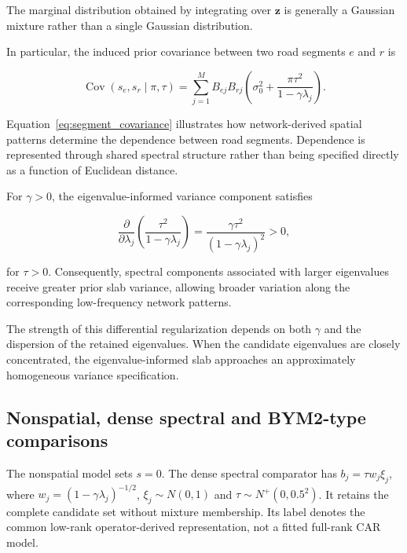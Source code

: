 \documentclass[11pt]{article}
\begin{document}
The marginal distribution obtained by integrating over
$\mathbf{z}$ is generally a Gaussian mixture rather than
a single Gaussian distribution.

In particular, the induced prior covariance between two road 
segments $e$ and $r$ is

\begin{equation}
	\operatorname{Cov}(s_e,s_r\mid\pi,\tau)
	=
	\sum_{j=1}^{M}
	B_{ej}B_{rj}
	\left(
	\sigma_0^2+
	\frac{\pi\tau^2}{1-\gamma\lambda_j}
	\right).
	\label{eq:segment_covariance}
\end{equation}

Equation~\eqref{eq:segment_covariance} illustrates how 
network-derived spatial patterns determine the dependence 
between road segments. Dependence is represented through 
shared spectral structure rather than being specified directly 
as a function of Euclidean distance.

For $\gamma>0$, the eigenvalue-informed variance component 
satisfies

\begin{equation}
	\frac{\partial}{\partial\lambda_j}
	\left(
	\frac{\tau^2}{1-\gamma\lambda_j}
	\right)
	=
	\frac{\gamma\tau^2}
	{(1-\gamma\lambda_j)^2}
	>0,
\end{equation}

for $\tau>0$. Consequently, spectral components associated 
with larger eigenvalues receive greater prior slab variance, 
allowing broader variation along the corresponding 
low-frequency network patterns.

The strength of this differential regularization depends on 
both $\gamma$ and the dispersion of the retained eigenvalues.
When the candidate eigenvalues are closely concentrated, 
the eigenvalue-informed slab approaches an approximately 
homogeneous variance specification.

\subsection{Nonspatial, dense spectral and BYM2-type comparisons}
The nonspatial model sets $s=0$. The dense spectral comparator has $b_j=\tau w_j\xi_j$, where $w_j=(1-\gamma\lambda_j)^{-1/2}$, $\xi_j\sim N(0,1)$ and $\tau\sim N^+(0,0.5^2)$. It retains the complete candidate set without mixture membership. Its label denotes the common low-rank operator-derived representation, not a fitted full-rank CAR model.
\end{document}
